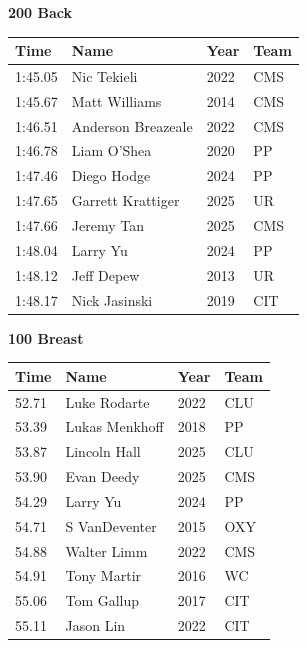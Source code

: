 \vspace{1.2em}
\noindent\begin{minipage}[t]{0.98\textwidth}
\centering
\textbf{\textcolor{teamprimary}{200 Back}}\par
\vspace{0.5em}
\centering
\small
\renewcommand{\arraystretch}{1.0}
\setlength{\tabcolsep}{4pt}
\begin{tabular}{@{}p{2.5cm}p{4.5cm}p{1.5cm}p{2.5cm}@{}}
\toprule
\textbf{Time} & \textbf{Name} & \textbf{Year} & \textbf{Team} \\
\midrule
1:45.05 & Nic Tekieli & 2022 & CMS \\
1:45.67 & Matt Williams & 2014 & CMS \\
1:46.51 & Anderson Breazeale & 2022 & CMS \\
1:46.78 & Liam O'Shea & 2020 & PP \\
1:47.46 & Diego Hodge & 2024 & PP \\
1:47.65 & Garrett Krattiger & 2025 & UR \\
1:47.66 & Jeremy Tan & 2025 & CMS \\
1:48.04 & Larry Yu & 2024 & PP \\
1:48.12 & Jeff Depew & 2013 & UR \\
1:48.17 & Nick Jasinski & 2019 & CIT \\
\bottomrule
\end{tabular}
\end{minipage}
\vspace{1.2em}
\noindent\begin{minipage}[t]{0.98\textwidth}
\centering
\textbf{\textcolor{teamprimary}{100 Breast}}\par
\vspace{0.5em}
\centering
\small
\renewcommand{\arraystretch}{1.0}
\setlength{\tabcolsep}{4pt}
\begin{tabular}{@{}p{2.5cm}p{4.5cm}p{1.5cm}p{2.5cm}@{}}
\toprule
\textbf{Time} & \textbf{Name} & \textbf{Year} & \textbf{Team} \\
\midrule
52.71 & Luke Rodarte & 2022 & CLU \\
53.39 & Lukas Menkhoff & 2018 & PP \\
53.87 & Lincoln Hall & 2025 & CLU \\
53.90 & Evan Deedy & 2025 & CMS \\
54.29 & Larry Yu & 2024 & PP \\
54.71 & S VanDeventer & 2015 & OXY \\
54.88 & Walter Limm & 2022 & CMS \\
54.91 & Tony Martir & 2016 & WC \\
55.06 & Tom Gallup & 2017 & CIT \\
55.11 & Jason Lin & 2022 & CIT \\
\bottomrule
\end{tabular}
\end{minipage}
